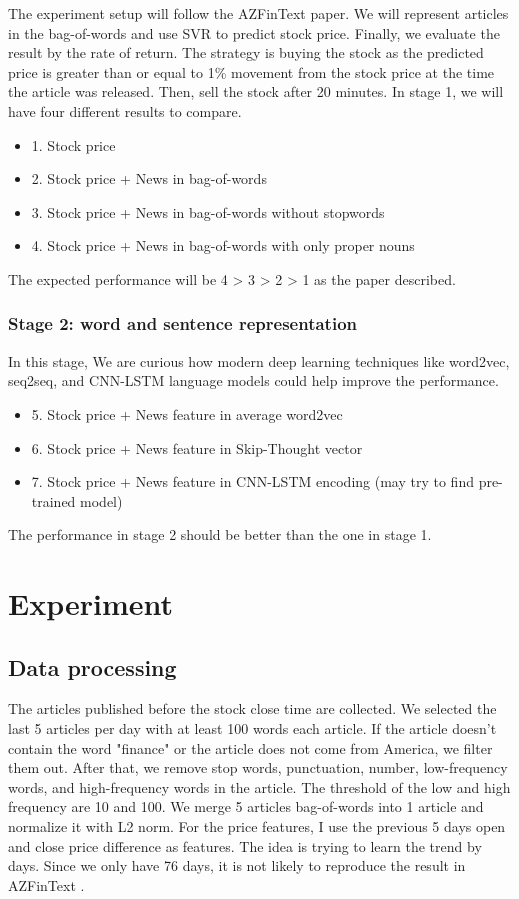 \documentclass[sigconf]{acmart}
\begin{document}
	The experiment setup will follow the AZFinText paper. We will represent articles in the bag-of-words and use SVR to predict stock price. Finally, we evaluate the result by the rate of return.
	The strategy is buying the stock as the predicted price is greater than or equal to 1\% movement from the stock price at the time the article was released. Then, sell the stock after 20 minutes.
	In stage 1, we will have four different results to compare.
	\\
	\begin{itemize}
		\item 1. Stock price
		\item 2. Stock price + News in bag-of-words
		\item 3. Stock price + News in bag-of-words without stopwords
		\item 4. Stock price + News in bag-of-words with only proper nouns
	\end{itemize}
	The expected performance will be 4 > 3 > 2 > 1 as the paper described.

\subsubsection{Stage 2: word and sentence representation}
	In this stage, We are curious how modern deep learning techniques like word2vec, seq2seq, and CNN-LSTM language models could help improve the performance.  
	\begin{itemize}
		\item 5. Stock price + News feature in average word2vec \cite{word2vec1, word2vec2}
		\item 6. Stock price + News feature in Skip-Thought vector\cite{skip}
		\item 7. Stock price + News feature in CNN-LSTM encoding \cite{CNN2RNN} (may try to find pre-trained model)
	\end{itemize}
	The performance in stage 2 should be better than the one in stage 1.

\section{Experiment}
\subsection{Data processing}
The articles published before the stock close time are collected. We selected the last 5 articles per day with at least 100 words each article. If the article doesn't contain the word "finance" or the article does
not come from America, we filter them out. After that, we remove stop words, punctuation, number, low-frequency words, and high-frequency words in the article. The threshold of the low and high frequency
are 10 and 100. We merge 5 articles bag-of-words into 1 article and normalize it with L2 norm.  For the price features, I use the previous 5 days open and close price difference as features. The idea is trying to learn
the trend by days. Since we only have 76 days, it is not likely to reproduce the result in AZFinText \cite{AZFinText}.
\end{document}
